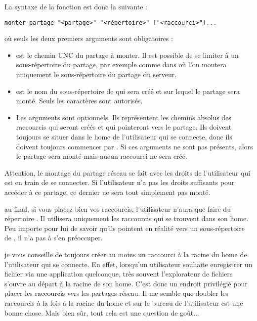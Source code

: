La syntaxe de la fonction  est donc
la suivante :
%
\begin{lstlisting}
monter_partage "<partage>" "<répertoire>" ["<raccourci>"]...
\end{lstlisting}
%
où seuls les deux premiers arguments sont obligatoires :
\begin{itemize}
\item {} est le chemin UNC du partage à monter.
Il est possible de se limiter à un sous-répertoire du partage,
par exemple comme dans  où l'on
montera uniquement le sous-répertoire  du
partage  du serveur.

\item {} est le nom du sous-répertoire
de  qui sera créé et sur lequel le
partage sera monté. Seuls les caractères 
sont autorisés.

\item Les arguments  sont optionnels. Ils
représentent les chemins absolus des raccourcis qui seront créés
et qui pointeront vers le partage. Ils doivent toujours se situer
dans le home de l'utilisateur qui se connecte, donc ils doivent
toujours commencer par . Si ces arguments
ne sont pas présents, alors le partage sera monté mais 
aucun raccourci ne sera créé.
\end{itemize}

\begin{alerte}
Attention, le montage du partage réseau se fait avec les droits
de l'utilisateur qui est en train de se connecter. Si l'utilisateur
n'a pas les droits suffisants pour accéder à ce partage, ce dernier
ne sera tout simplement pas monté.
\end{alerte}

\begin{RQ}
au final, si vous placez bien vos raccourcis, l'utilisateur
n'aura que faire du répertoire . Il
utilisera uniquement les raccourcis qui se trouvent dans son home. Peu importe
pour lui de savoir qu'ils pointent en réalité vers un sous-répertoire
de , il n'a pas à s'en préoccuper.
\end{RQ}

\begin{RQ}
je vous conseille de toujours créer au moins un raccourci à
la racine du home de l'utilisateur qui se connecte. En effet,
lorsqu'un utilisateur souhaite enregistrer un fichier via une application quelconque,
très souvent l'explorateur de fichiers s'ouvre au départ à la racine de son
home. C'est donc un
endroit privilégié pour placer les raccourcis vers les partages réseau.
Il me semble que doubler les raccourcis à la fois à la racine du home
et sur le bureau de l'utilisateur est une bonne chose.
Mais bien sûr, tout cela est une question de goût...
\end{RQ}


